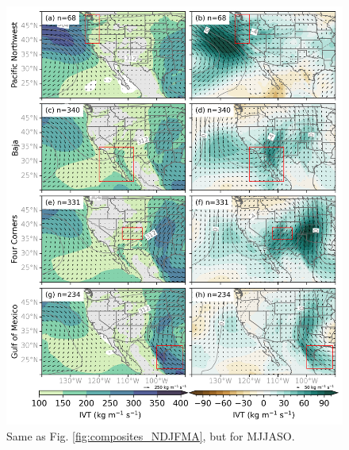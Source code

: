 \documentclass[draft]{agujournal2019}
\begin{document}
\begin{figure}
\noindent\includegraphics[width=\textwidth, height=\textheight, keepaspectratio]{fig7.png}
\caption{Same as Fig. \ref{fig:composites_NDJFMA}, but for MJJASO.}
\label{fig:composites_MJJASO}
\end{figure}
\end{document}
